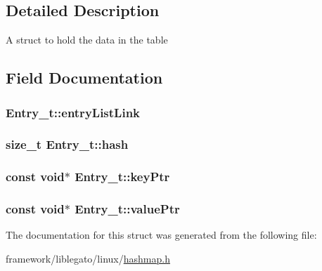 \subsection{Detailed Description}
A struct to hold the data in the table 

\subsection{Field Documentation}
\subsubsection[{\texorpdfstring{entry\+List\+Link}{entryListLink}}]{ Entry\+\_\+t\+::entry\+List\+Link}\hypertarget{struct_entry_a5253e0b3c69ddb17f7dfdf7c6b16dc0f}{}\label{struct_entry_a5253e0b3c69ddb17f7dfdf7c6b16dc0f}
\subsubsection[{\texorpdfstring{hash}{hash}}]{\setlength{\rightskip}{0pt plus 5cm}size\+\_\+t Entry\+\_\+t\+::hash}\hypertarget{struct_entry_a88a00783aa2afe2217b79af4e09a9b3b}{}\label{struct_entry_a88a00783aa2afe2217b79af4e09a9b3b}
\subsubsection[{\texorpdfstring{key\+Ptr}{keyPtr}}]{\setlength{\rightskip}{0pt plus 5cm}const {\bf void}$\ast$ Entry\+\_\+t\+::key\+Ptr}\hypertarget{struct_entry_a078bf33837bab86d5120f7e3baa747d7}{}\label{struct_entry_a078bf33837bab86d5120f7e3baa747d7}
\subsubsection[{\texorpdfstring{value\+Ptr}{valuePtr}}]{\setlength{\rightskip}{0pt plus 5cm}const {\bf void}$\ast$ Entry\+\_\+t\+::value\+Ptr}\hypertarget{struct_entry_abbbe413e8daeb8c26fa2b0c74088604c}{}\label{struct_entry_abbbe413e8daeb8c26fa2b0c74088604c}


The documentation for this struct was generated from the following file\+:\begin{DoxyCompactItemize}
\item 
framework/liblegato/linux/\hyperlink{hashmap_8h}{hashmap.\+h}\end{DoxyCompactItemize}
